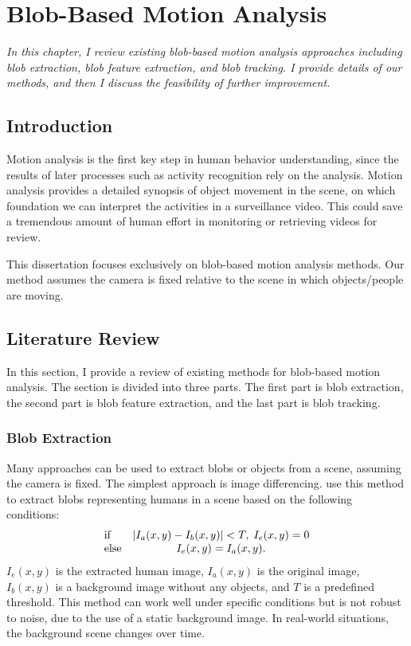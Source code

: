 \setlength{\footskip}{8mm}

\chapter{Blob-Based Motion Analysis}
\label{ch:blobanalysis}

\textit{In this chapter, I review existing blob-based motion analysis
approaches including blob extraction, blob feature extraction, and
blob tracking. I provide details of our methods, and then I discuss
the feasibility of further improvement.}

\section{Introduction}

Motion analysis is the first key step in human behavior understanding,
since the results of later processes such as activity recognition rely
on the analysis.  Motion analysis provides a detailed synopsis of
object movement in the scene, on which foundation we can interpret the
activities in a surveillance video. This could save a tremendous
amount of human effort in monitoring or retrieving videos for review.

This dissertation focuses exclusively on blob-based motion analysis
methods. Our method assumes the camera is fixed relative to the scene
in which objects/people are moving.

\section{Literature Review}

In this section, I provide a review of existing methods for blob-based
motion analysis. The section is divided into three parts. The first
part is blob extraction, the second part is blob feature
extraction, and the last part is blob tracking.

\subsection{Blob Extraction}

Many approaches can be used to extract blobs or objects from a scene,
assuming the camera is fixed. The simplest approach is image
differencing.  use this method to extract
blobs representing humans in a scene based on the following
conditions:
\[
  \begin{array}{lc}
    {\rm if} & |{I_a (x,y) - I_b (x,y)}|< T,\;I_e (x,y) = 0 \\ 
    {\rm else} & I_e (x,y) = I_a (x,y).
  \end{array}
\]
$I_e (x,y)$ is the extracted human image, $I_a (x,y)$ is the original
image, $I_b (x,y)$ is a background image without any objects, and $T$
is a predefined threshold. This method can work well under specific
conditions but is not robust to noise, due to the use of a static
background image. In real-world situations, the background scene
changes over time.

